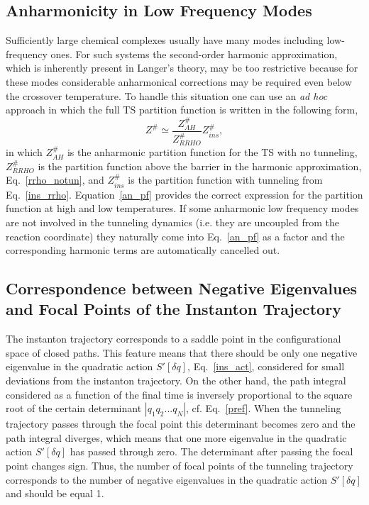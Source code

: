 \documentclass[journal=jpcafh,manuscript=article]{achemso}
\begin{document}
\subsection{Anharmonicity in Low Frequency Modes}

Sufficiently large chemical complexes usually have many modes
including low-frequency ones. For such systems the second-order
harmonic approximation, which is inherently present in Langer's
theory, may be too restrictive because for these modes considerable
anharmonical corrections may be required even below the crossover
temperature. To handle this situation one can use an {\em ad hoc}
approach in which the full TS partition function is written in the
following form,\cite{beyer16}
\begin{equation}
  \label{an_pf}
  Z^\#\simeq\frac{Z^\#_{AH}}{Z^\#_{RRHO}}Z^\#_{ins},
\end{equation}
in which $Z^\#_{AH}$ is the anharmonic partition function for the TS
with no tunneling, $Z^\#_{RRHO}$ is the partition function above the
barrier in the harmonic approximation, Eq.~\ref{rrho_notun}, and
$Z^\#_{ins}$ is the partition function with tunneling from
Eq.~\ref{ins_rrho}.  Equation~\ref{an_pf} provides the correct
expression for the partition function at high and low temperatures. If
some anharmonic low frequency modes are not involved in the tunneling
dynamics (i.e. they are uncoupled from the reaction coordinate) they
naturally come into Eq.~\ref{an_pf} as a factor and the
corresponding harmonic terms are automatically cancelled out.

\subsection{Correspondence between Negative Eigenvalues and Focal
  Points of the Instanton Trajectory}

The instanton trajectory corresponds to a saddle point in the
configurational space of closed paths. This feature means that there
should be only one negative eigenvalue in the quadratic action
$S'[\delta q]$, Eq.~\ref{ins_act}, considered for small deviations
from the instanton trajectory. On the other hand, the path integral
considered as a function of the final time is inversely proportional
to the square root of the certain determinant $|q_1q_2...q_N|$,
cf. Eq.~\ref{pref}. When the tunneling trajectory passes through the
focal point this determinant becomes zero and the path integral
diverges, which means that one more eigenvalue in the quadratic action
$S'[\delta q]$ has passed through zero. The determinant after passing
the focal point changes sign. Thus, the number of focal points of the
tunneling trajectory corresponds to the number of negative eigenvalues
in the quadratic action $S'[\delta q]$ and should be equal 1.
\end{document}
